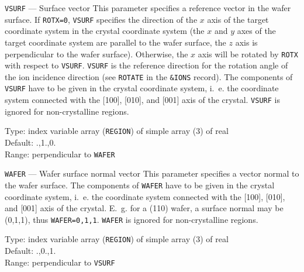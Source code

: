 \begin{keydescription}{\texttt{VSURF} --- Surface vector}
%
  This parameter specifies a reference vector in the wafer surface.  If
  \texttt{ROTX=0}, \texttt{VSURF} specifies the direction of the $x$ axis of
  the target coordinate system in the crystal coordinate system (the $x$ and
  $y$ axes of the target coordinate system are parallel to the wafer surface,
  the $z$ axis is perpendicular to the wafer surface). Otherwise, the $x$ axis
  will be rotated by \texttt{ROTX} with respect to \texttt{VSURF}.
  \texttt{VSURF} is the reference direction for the rotation angle of
  the ion incidence direction (see \texttt{ROTATE} in the
  \texttt{\&IONS} record). The components of \texttt{VSURF} have to be
  given in the crystal coordinate system, i.~e.  the coordinate
  system connected with the [100], [010], and [001] axis of the
  crystal.  \texttt{VSURF} is ignored for non-crystalline regions.
%
  \begin{keytab}
    Type:    \> index variable array (\texttt{REGION}) of simple array
                (3) of real \\
    Default: .,1.,0. \\
    Range: \> perpendicular to \texttt{WAFER}
  \end{keytab}
\end{keydescription}

\begin{keydescription}{\texttt{WAFER} --- Wafer surface normal vector}
%
  This parameter specifies a vector normal to the wafer surface. The
  components of \texttt{WAFER} have to be given in the crystal
  coordinate system, i.~e.  the coordinate system connected with the
  [100], [010], and [001] axis of the crystal. E.~g. for a (110)
  wafer, a surface normal may be (0,1,1), thus \texttt{WAFER=0,1,1}.
  \texttt{WAFER}  is ignored for non-crystalline regions.
%
  \begin{keytab}
    Type:    \> index variable array (\texttt{REGION}) of simple array
                (3) of real \\
    Default: .,0.,1. \\
    Range:   \> perpendicular to \texttt{VSURF}
  \end{keytab}
\end{keydescription}

